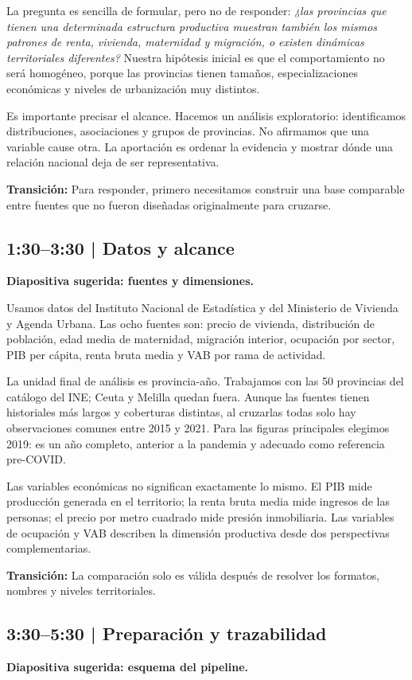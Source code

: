\documentclass[11pt,a4paper]{article}
\begin{document}
La pregunta es sencilla de formular, pero no de responder: \emph{¿las provincias que tienen una determinada estructura productiva muestran también los mismos patrones de renta, vivienda, maternidad y migración, o existen dinámicas territoriales diferentes?} Nuestra hipótesis inicial es que el comportamiento no será homogéneo, porque las provincias tienen tamaños, especializaciones económicas y niveles de urbanización muy distintos.

Es importante precisar el alcance. Hacemos un análisis exploratorio: identificamos distribuciones, asociaciones y grupos de provincias. No afirmamos que una variable cause otra. La aportación es ordenar la evidencia y mostrar dónde una relación nacional deja de ser representativa.

\textbf{Transición:} Para responder, primero necesitamos construir una base comparable entre fuentes que no fueron diseñadas originalmente para cruzarse.

\subsection{1:30--3:30 | Datos y alcance}
\textbf{Diapositiva sugerida: fuentes y dimensiones.}

Usamos datos del Instituto Nacional de Estadística y del Ministerio de Vivienda y Agenda Urbana. Las ocho fuentes son: precio de vivienda, distribución de población, edad media de maternidad, migración interior, ocupación por sector, PIB per cápita, renta bruta media y VAB por rama de actividad.

La unidad final de análisis es provincia-año. Trabajamos con las 50 provincias del catálogo del INE; Ceuta y Melilla quedan fuera. Aunque las fuentes tienen historiales más largos y coberturas distintas, al cruzarlas todas solo hay observaciones comunes entre 2015 y 2021. Para las figuras principales elegimos 2019: es un año completo, anterior a la pandemia y adecuado como referencia pre-COVID.

Las variables económicas no significan exactamente lo mismo. El PIB mide producción generada en el territorio; la renta bruta media mide ingresos de las personas; el precio por metro cuadrado mide presión inmobiliaria. Las variables de ocupación y VAB describen la dimensión productiva desde dos perspectivas complementarias.

\textbf{Transición:} La comparación solo es válida después de resolver los formatos, nombres y niveles territoriales.

\subsection{3:30--5:30 | Preparación y trazabilidad}
\textbf{Diapositiva sugerida: esquema del pipeline.}
\end{document}
